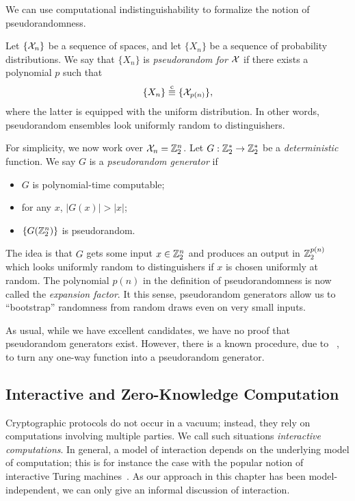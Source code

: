 \begin{ex}\label{ex:pseudorandomness}
  We can use computational indistinguishability to formalize the notion of
  pseudorandomness.

  Let $\{\mathcal{X}_n\}$ be a sequence of spaces, and let $\{X_n\}$ be a sequence of
  probability distributions. We say that $\{X_n\}$ is \emph{pseudorandom for
  $\mathcal{X}$} if there exists a polynomial $p$ such that \[
    \{X_n\} \overset{\text{c}}{\equiv} \{\mathcal{X}_{p(n)}\},
  \]where the latter is equipped with the uniform distribution. In other words,
  pseudorandom ensembles look uniformly random to distinguishers.

  For simplicity, we now work over $\mathcal{X}_n = \mathbb{Z}_2^n$. Let $G:
  \mathbb{Z}_2^*\to\mathbb{Z}_2^*$ be a \emph{deterministic} function. We say $G$
  is a \emph{pseudorandom generator} if \begin{itemize}
    \item $G$ is polynomial-time computable;
    \item for any $x$, $|G(x)| > |x|$;
    \item $\{G(\mathbb{Z}_2^n)\}$ is pseudorandom.
  \end{itemize}
  The idea is that $G$ gets some input $x\in\mathbb{Z}_2^n$ and produces an output in
  $\mathbb{Z}_2^{p(n)}$ which looks uniformly random to distinguishers if $x$ is chosen
  uniformly at random. The polynomial $p(n)$ in the definition of
  pseudorandomness is now called the \emph{expansion factor}. It this sense, pseudorandom generators allow us to
  ``bootstrap'' randomness from random draws even on very small inputs.

  As usual, while we have excellent candidates, we have no proof that
  pseudorandom generators exist. However, there is a known procedure, due
  to \citeauthor{hastad-1999}~\cite{hastad-1999}, to turn any one-way function
  into a pseudorandom generator.
\end{ex}

\subsection{Interactive and Zero-Knowledge Computation}
\label{sec:interactive computation}
\label{sec:zero-knowledge}

Cryptographic protocols do not occur in a vacuum; instead, they rely on
computations involving multiple parties. We call such situations \emph{interactive
computations}. In general, a model of interaction depends on
the underlying model of computation; this is for instance the case with the
popular notion of interactive Turing machines~\cite[Definition
4.2.1]{goldreich-2001}. As our approach in this chapter has been
model-independent, we can only give an informal discussion of interaction.

